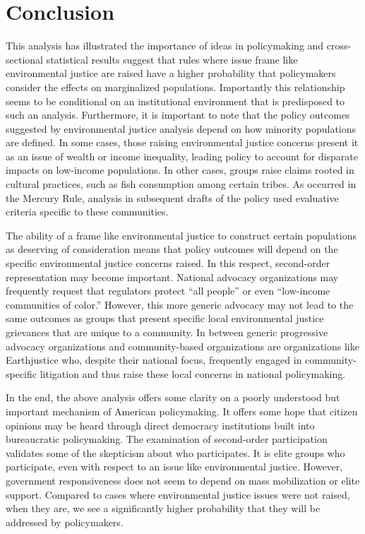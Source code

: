 \section{Conclusion}
This analysis has illustrated the importance of ideas in policymaking and cross-sectional statistical results suggest that rules where issue frame like environmental justice are raised have a higher probability that policymakers consider the effects on marginalized populations. Importantly this relationship seems to be conditional on an institutional environment that is predisposed to such an analysis. Furthermore, it is important to note that the policy outcomes suggested by environmental justice analysis depend on how minority populations are defined. In some cases, those raising environmental justice concerns present it as an issue of wealth or income inequality, leading policy to account for disparate impacts on low-income populations. In other cases, groups raise claims rooted in cultural practices, such as fish consumption among certain tribes. As occurred in the Mercury Rule, analysis in subsequent drafts of the policy used evaluative criteria specific to these communities. 

The ability of a frame like environmental justice to construct certain populations as deserving of consideration means that policy outcomes will depend on the specific environmental justice concerns raised. In this respect, second-order representation may become important. National  advocacy organizations may frequently request that regulators protect ``all people'' or even ``low-income communities of color.'' However, this more generic advocacy may not lead to the same outcomes as groups that present specific local environmental justice grievances that are unique to a community. In between generic progressive advocacy organizations and community-based organizations are organizations like Earthjustice who, despite their national focus, frequently engaged in community-specific litigation and thus raise these local concerns in national policymaking. 

In the end, the above analysis offers some clarity on a poorly understood but important mechanism of American policymaking. It offers some hope that citizen opinions may be heard through direct democracy institutions built into bureaucratic policymaking.  The examination of second-order participation validates some of the skepticism about who participates. It is elite groups who participate, even with respect to an issue like environmental justice. However, government responsiveness does not seem to depend on mass mobilization or elite support. Compared to cases where environmental justice issues were not raised, when they are, we see a significantly higher probability that they will be addressed by policymakers. 